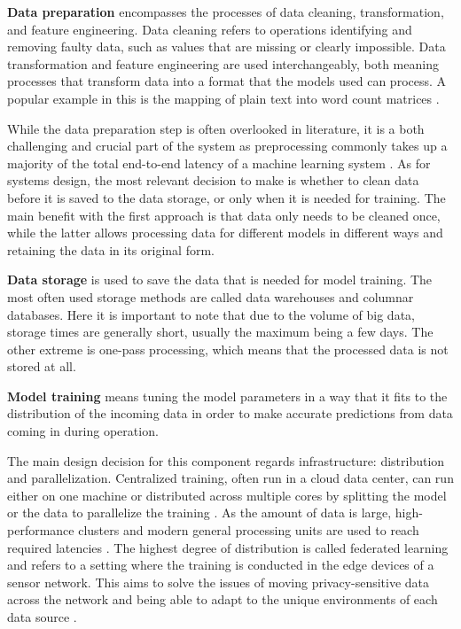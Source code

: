 \textbf{Data preparation} encompasses the processes of data cleaning, transformation, and feature engineering. Data cleaning refers to operations identifying and removing faulty data, such as values that are missing or clearly impossible. Data transformation and feature engineering are used interchangeably, both meaning processes that transform data into a format that the models used can process. A popular example in this is the mapping of plain text into word count matrices \cite{dapbook}.

While the data preparation step is often overlooked in literature,
it is a both challenging and crucial part of the system as preprocessing commonly takes up a majority of the total end-to-end latency of a machine learning system \cite{adaptivelearningsystems}. As for systems design, the most relevant decision to make is whether to clean data before it is saved to the data storage, or only when it is  needed for training. The main benefit with the first approach is that data only needs to be cleaned once, while the latter allows processing data for different models in different ways and retaining the data in its original form.

\textbf{Data storage} is used to save the data that is needed for model training. The most often used storage methods are called data warehouses and columnar databases. Here it is important to note that due to the volume of big data, storage times are generally short, usually the maximum being a few days. The other extreme is one-pass processing, which means that the processed data is not stored at all.

\textbf{Model training} means tuning the model parameters in a way that it fits to the distribution of the incoming data in order to make accurate predictions from data coming in during operation.

The main design decision for this component regards infrastructure: distribution and parallelization. Centralized training, often run in a cloud data center, can run either on one machine or distributed across multiple cores by splitting the model or the data to parallelize the training \cite{ben-nun_demystifying_2019}. As the amount of data is large, high-performance clusters and modern general processing units are used to reach required latencies \cite{iotsurvey}. The highest degree of distribution is called federated learning and refers to a setting where the training is conducted in the edge devices of a sensor network. This aims to solve the issues of moving privacy-sensitive data across the network and being able to adapt to the unique environments of each data source \cite{iotsurvey}.

